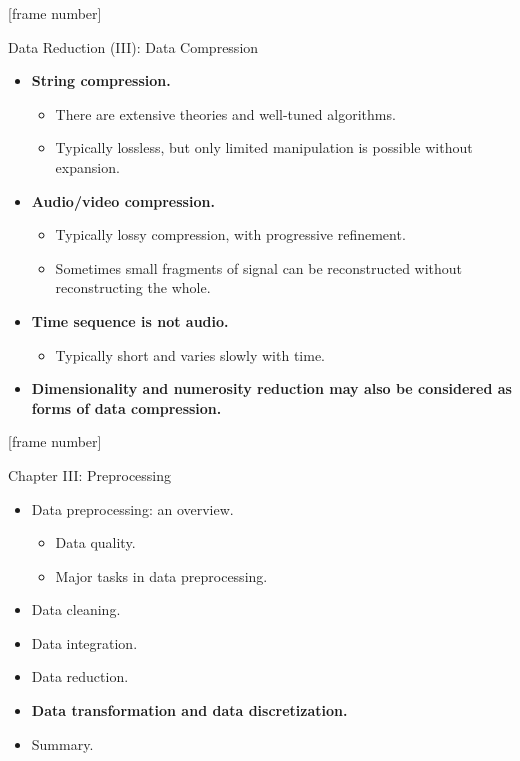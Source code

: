 \documentclass[aspectratio=169,t]{beamer}
\begin{document}
  {
    [frame number]
    \begin{frame}{Data Reduction (III): Data Compression}
        \begin{itemize}
            \item \textbf{String compression.}
            \begin{itemize}
              \item There are extensive theories and well-tuned algorithms.
              \item Typically lossless, but only limited manipulation is possible without expansion.
            \end{itemize}
            \item \textbf{Audio/video compression.}
            \begin{itemize}
              \item Typically lossy compression, with progressive refinement.
              \item Sometimes small fragments of signal can be reconstructed without reconstructing the whole.
            \end{itemize}
            \item \textbf{Time sequence is not audio.}
            \begin{itemize}
              \item Typically short and varies slowly with time.
            \end{itemize}
            \item \textbf{Dimensionality and numerosity reduction may also be considered as forms of data compression.}
        \end{itemize}
    \end{frame}
  }

  {
    [frame number]
    \begin{frame}{Chapter III: Preprocessing}
        \begin{itemize}
            \item Data preprocessing: an overview.
            \begin{itemize}
              \item Data quality.
              \item Major tasks in data preprocessing.
            \end{itemize}
            \item Data cleaning.
            \item Data integration.
            \item Data reduction.
            \item \textbf{Data transformation and data discretization.}
            \item Summary.
        \end{itemize}
    \end{frame}
  }
\end{document}
